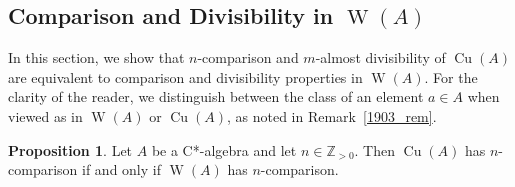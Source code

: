 \documentclass[10pt]{amsart}
\numberwithin{equation}{section}
\theoremstyle{definition}
\newtheorem{prp}[thm]{Proposition}
\newcommand{\N}{{\mathbb{Z}}_{> 0}}
\newcommand{\Cu}{{\operatorname{Cu}}}
\newcommand{\W}{{\operatorname{W}}}
\newcommand{\ca}{C*-algebra}
\begin{document}
\subsection{Comparison and Divisibility in $\W (A)$}\label{SubSec_WA}

In this section, we show that $n$-comparison and
$m$-almost divisibility of $\Cu (A)$ are equivalent to
comparison and divisibility properties in  $\W (A)$.
For the clarity of the reader, we distinguish between the class
of an element $a \in A$ when viewed as in $\W (A)$ or $\Cu (A)$,
as noted in Remark~\ref{1903_rem}.

\begin{prp}\label{CP_6325_WA_Cmp}
Let $A$ be a \ca{} and let $n \in \N$.
Then $\Cu (A)$ has $n$-comparison
if and only if $\W (A)$ has $n$-comparison.
\end{prp}
\end{document}
